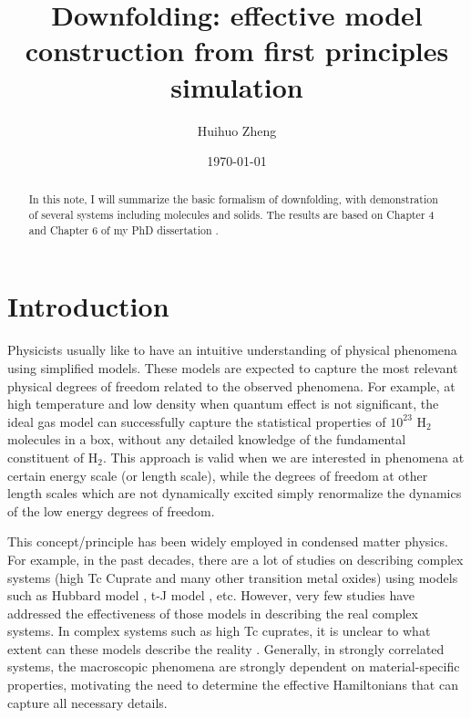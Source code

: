 \documentclass[aps, prb]{revtex4-1}
\begin{document}
\title{Downfolding: effective model construction from first principles simulation}
\author{Huihuo Zheng}
\date{\today}
\begin{abstract}
In this note, I will summarize the basic formalism of downfolding, with demonstration of several systems including molecules and solids. The results are based on Chapter 4 and Chapter 6 of my PhD dissertation \cite{ZhengThesis}. 
\end{abstract}

\maketitle
\newcommand{\newt}[1]{{#1}}
\section{Introduction}
Physicists usually like to have an intuitive understanding of physical phenomena using simplified models. These models are expected to capture the most relevant physical degrees of freedom related to the observed phenomena. For example, at high temperature and low density when quantum effect is not significant, the ideal gas model can successfully capture the statistical properties of $10^{23}$ H$_{2}$ molecules in a box, without any detailed knowledge of the fundamental constituent of H$_{2}$. This approach is valid when we are interested in phenomena at certain energy scale (or length scale), while the degrees of freedom at other length scales which are not dynamically excited simply renormalize the dynamics of the low energy degrees of freedom. 

This concept/principle has been widely employed in condensed matter physics. For example, in the past decades, there are a lot of studies on describing complex systems (high Tc Cuprate and many other transition metal oxides) using models such as Hubbard model \cite{Yanagisawa2008}, t-J model \cite{Sorella2002}, etc. However, very few studies have addressed the effectiveness of those models in describing the real complex systems. In complex systems such as high Tc cuprates, it is unclear to what extent can these models describe the reality \cite{Anderson2013}. Generally, in strongly correlated systems, the macroscopic phenomena are strongly dependent on material-specific properties, motivating the need to determine the effective Hamiltonians that can capture all necessary details. 
\end{document}
